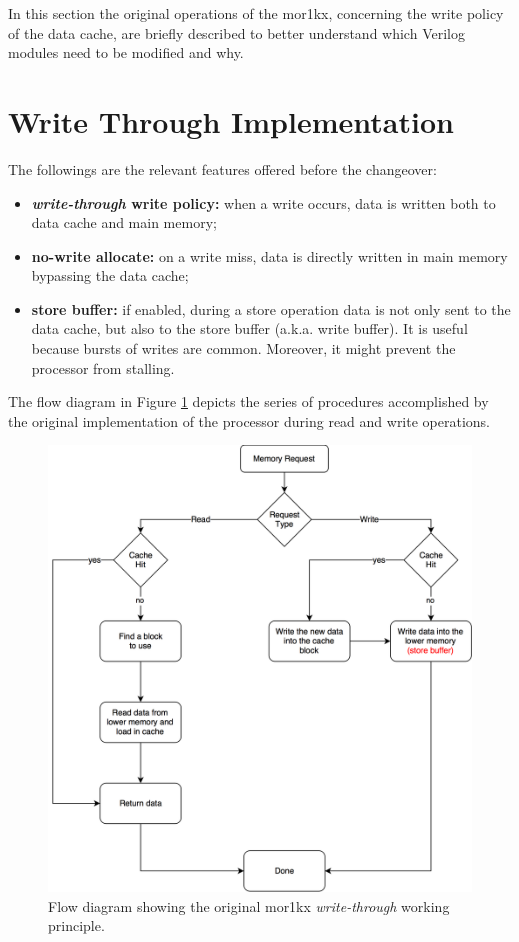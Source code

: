 In this section the original operations of the mor1kx, concerning the write policy of the data cache, are briefly described to better understand which Verilog modules need to be modified and why.

\section{Write Through Implementation}
The followings are the relevant features offered before the changeover:
\begin{itemize}
	\item \textbf{\textit{write-through} write policy:} when a write occurs, data is written both to data cache and main memory;
	\item \textbf{no-write allocate:} on a write miss, data is directly written in main memory bypassing the data cache;
	\item \textbf{store buffer:} if enabled, during a store operation data is not only sent to the data cache, but also to the store buffer (a.k.a. write buffer). It is useful because bursts of writes are common. Moreover, it might prevent the processor from stalling.
\end{itemize}

The flow diagram in Figure \ref{wt_flow_diagram} depicts the series of procedures accomplished by the original implementation of the processor during read and write operations.

\begin{figure}[H]
	\begin{center}
		\includegraphics[width=\textwidth]{./pictures/cache_wt_flow.png}
		\caption{Flow diagram showing the original mor1kx \textit{write-through} working principle.}
		\label{wt_flow_diagram}
	\end{center}
\end{figure}

